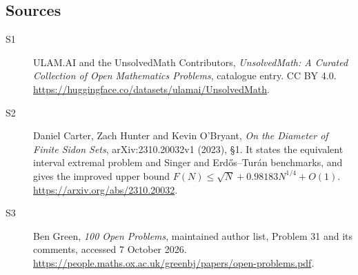 \documentclass[11pt]{article}
\begin{document}
\subsection{Sources}
\begin{description}
\item[\hypertarget{source:statement:1}{S1}] ULAM.AI and the UnsolvedMath Contributors, \emph{UnsolvedMath: A Curated Collection of Open Mathematics Problems}, catalogue entry. CC BY 4.0. \url{https://huggingface.co/datasets/ulamai/UnsolvedMath}.
\item[\hypertarget{source:statement:2}{S2}] Daniel Carter, Zach Hunter and Kevin O’Bryant, \emph{On the Diameter of Finite Sidon Sets}, arXiv:2310.20032v1 (2023), §1. It states the equivalent interval extremal problem and Singer and Erdős--Turán benchmarks, and gives the improved upper bound $F(N)\leq\sqrt N+0.98183N^{1/4}+O(1)$. \url{https://arxiv.org/abs/2310.20032}.
\item[\hypertarget{source:statement:3}{S3}] Ben Green, \emph{100 Open Problems}, maintained author list, Problem 31 and its comments, accessed 7 October 2026. \url{https://people.maths.ox.ac.uk/greenbj/papers/open-problems.pdf}.
\end{description}
\label{end:statement}
\end{document}
